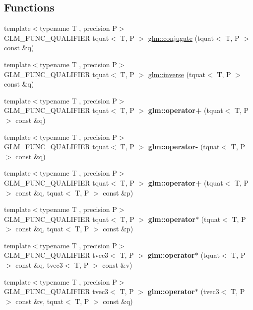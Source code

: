 \subsection*{Functions}
\begin{DoxyCompactItemize}
\item 
{\footnotesize template$<$typename T , precision P$>$ }\\G\+L\+M\+\_\+\+F\+U\+N\+C\+\_\+\+Q\+U\+A\+L\+I\+F\+I\+ER tquat$<$ T, P $>$ \hyperlink{group__gtc__quaternion_gab1ace864fbf189ffa368950001808a3c}{glm\+::conjugate} (tquat$<$ T, P $>$ const \&q)
\item 
{\footnotesize template$<$typename T , precision P$>$ }\\G\+L\+M\+\_\+\+F\+U\+N\+C\+\_\+\+Q\+U\+A\+L\+I\+F\+I\+ER tquat$<$ T, P $>$ \hyperlink{group__gtc__quaternion_ga5f47300c024c2d809944e6ac661d6d14}{glm\+::inverse} (tquat$<$ T, P $>$ const \&q)
\item 
{\footnotesize template$<$typename T , precision P$>$ }\\G\+L\+M\+\_\+\+F\+U\+N\+C\+\_\+\+Q\+U\+A\+L\+I\+F\+I\+ER tquat$<$ T, P $>$ {\bfseries glm\+::operator+} (tquat$<$ T, P $>$ const \&q)
\item 
{\footnotesize template$<$typename T , precision P$>$ }\\G\+L\+M\+\_\+\+F\+U\+N\+C\+\_\+\+Q\+U\+A\+L\+I\+F\+I\+ER tquat$<$ T, P $>$ {\bfseries glm\+::operator-\/} (tquat$<$ T, P $>$ const \&q)
\item 
{\footnotesize template$<$typename T , precision P$>$ }\\G\+L\+M\+\_\+\+F\+U\+N\+C\+\_\+\+Q\+U\+A\+L\+I\+F\+I\+ER tquat$<$ T, P $>$ {\bfseries glm\+::operator+} (tquat$<$ T, P $>$ const \&q, tquat$<$ T, P $>$ const \&p)
\item 
{\footnotesize template$<$typename T , precision P$>$ }\\G\+L\+M\+\_\+\+F\+U\+N\+C\+\_\+\+Q\+U\+A\+L\+I\+F\+I\+ER tquat$<$ T, P $>$ {\bfseries glm\+::operator$\ast$} (tquat$<$ T, P $>$ const \&q, tquat$<$ T, P $>$ const \&p)
\item 
{\footnotesize template$<$typename T , precision P$>$ }\\G\+L\+M\+\_\+\+F\+U\+N\+C\+\_\+\+Q\+U\+A\+L\+I\+F\+I\+ER tvec3$<$ T, P $>$ {\bfseries glm\+::operator$\ast$} (tquat$<$ T, P $>$ const \&q, tvec3$<$ T, P $>$ const \&v)
\item 
{\footnotesize template$<$typename T , precision P$>$ }\\G\+L\+M\+\_\+\+F\+U\+N\+C\+\_\+\+Q\+U\+A\+L\+I\+F\+I\+ER tvec3$<$ T, P $>$ {\bfseries glm\+::operator$\ast$} (tvec3$<$ T, P $>$ const \&v, tquat$<$ T, P $>$ const \&q)

\end{DoxyCompactItemize}
